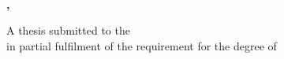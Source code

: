 

\begin{titlepage}
   \begin{center}

      \vfill
      {\LARGE\textbf{\thesistitle}}

      \vfill

      {\Large\textbf{\authorname}}

      \vfill

      {\large \textbf{\deptname}\\
         \textbf{\submissionmonth, \submissionyear}}

      \vfill

      A thesis submitted to the \schoolname \\
      in partial fulfilment of the requirement for the degree of \\
      \degreename


   \end{center}
\end{titlepage}


